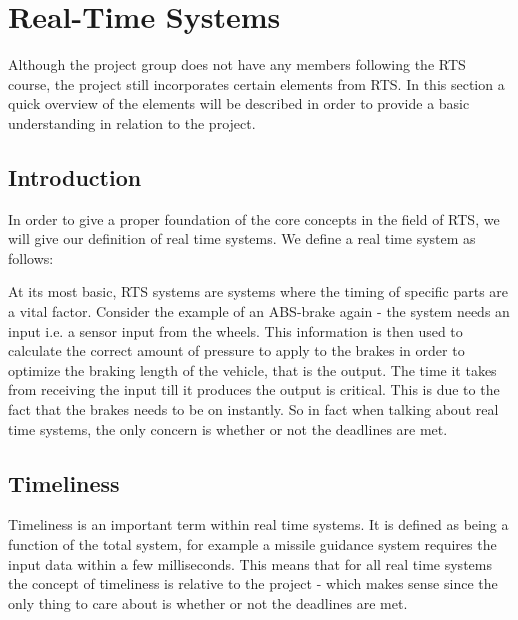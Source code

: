 \section{Real-Time Systems}
Although the project group does not have any members following the RTS course,
the project still incorporates certain elements from RTS. In this section a
quick overview of the elements will be described in order to provide a basic
understanding in relation to the project.

\subsection{Introduction}
In order to give a proper foundation of the core concepts in the field of RTS,
we will give our definition of real time systems. We define a real time system
as follows:  \nl

At its most basic, RTS systems are systems where the timing of specific
parts are a vital factor. Consider the example of an ABS-brake again - the
system needs an input i.e. a sensor input from the wheels. This information is
then used to calculate the correct amount of pressure to apply to the brakes in
order to optimize the braking length of the vehicle, that is the output. The
time it takes from receiving the input till it produces the output is critical.
This is due to the fact that the brakes needs to be on instantly. So in fact
when talking about real time systems, the only concern is whether or not the
deadlines are met.

\subsection{Timeliness}
Timeliness is an important term within real time systems. It is defined as being
a function of the total system, for example a missile guidance system requires
the input data within a few milliseconds. This means that for all real time
systems the concept of timeliness is relative to the project - which makes sense since the only thing
to care about is whether or not the deadlines are met.


